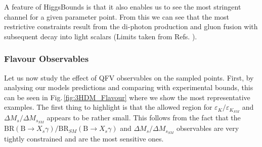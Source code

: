 \documentclass[10pt]{report}
\begin{document}
A feature of HiggsBounds is that it also enables us to see the most stringent channel for a given parameter point. 
%
From this we can see that the most restrictive constraints result from the di-photon production and gluon fusion with subsequent decay into light scalars (Limits taken from Refs. \cite{Aad_2014,CMS-PAS-HIG-14-029,Khachatryan_2015}). 

\subsubsection{Flavour Observables }

Let us now study the effect of QFV observables on the sampled points. 
%
First, by analysing our models predictions and comparing with experimental bounds, this can be seen in  Fig.\,\ref{fig:3HDM_Flavour} where we show the most representative examples.
%
The first thing to highlight is that the allowed region for $\varepsilon_K/\varepsilon_{K_{SM}}$ and ${\Delta M_s}/{\Delta M_{s_{SM}} }$ appears to be rather small.
 This follows from the fact that the ${\textrm{BR} ( \textrm{B} \rightarrow X_s \gamma)}/{\textrm{BR}_{SM} ( \textrm{B} \rightarrow X_s \gamma )}$ and ${\Delta M_s}/{\Delta M_{s_{SM}} }$ observables are very tightly constrained and are the most sensitive ones. 
\end{document}
